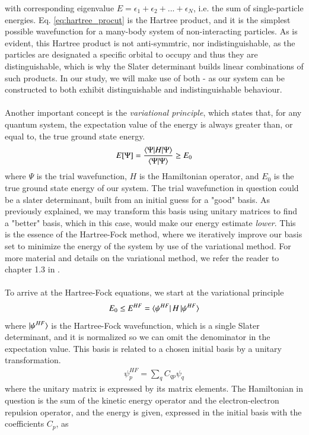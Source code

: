 \documentclass{subfiles}
\begin{document}
with corresponding eigenvalue $E = \epsilon_1 + \epsilon_2 + ... + \epsilon_N$, i.e. the sum of single-particle energies. Eq. \ref{eq:hartree_procut} is the Hartree product, and it is the simplest possible wavefunction for a many-body system of non-interacting particles. As is evident, this Hartree product is not anti-symmtric, nor indistinguishable, as the particles are designated a specific orbital to occupy and thus they are distinguishable, which is why the Slater determinant builds linear combinations of such products. In our study, we will make use of both - as our system can be constructed to both exhibit distinguishable and indistinguishable behaviour.\\ \\
Another important concept is the \emph{variational principle}, which states that, for any quantum system, the expectation value of the energy is always greater than, or equal to, the true ground state energy. 
\begin{align}
    E[\Psi] = \frac{\braket{\Psi|H|\Psi}}{\braket{\Psi|\Psi}} \geq E_0 \label{eq:variational_principle}
\end{align}
where $\Psi$ is the trial wavefunction, $H$ is the Hamiltonian operator, and $E_0$ is the true ground state energy of our system. The trial wavefunction in question could be a slater determinant, built from an initial guess for a "good" basis. As previously explained, we may transform this basis using unitary matrices to find a "better" basis, which in this case, would make our energy estimate \emph{lower}. This is the essence of the Hartree-Fock method, where we iteratively improve our basis set to minimize the energy of the system by use of the variational method. For more material and details on the variational method, we refer the reader to chapter 1.3 in \cite{szabo1996modern}.
\\\\
To arrive at the Hartree-Fock equations, we start at the variational principle
\begin{align*}
    E_0 \leq E^{HF} = \bra{\psi^{HF}}H\ket{\psi^{HF}}
\end{align*}
where $\ket{\psi^{HF}}$ is the Hartree-Fock wavefunction, which is a single Slater determinant, and it is normalized so we can omit the denominator in the expectation value. This basis is related to a chosen initial basis by a unitary transformation.
\begin{align*}
    \psi^{HF}_p = \sum_qC_{qp}\psi_q
\end{align*}
where the unitary matrix is expressed by its matrix elements. The Hamiltonian in question is the sum of the kinetic energy operator and the electron-electron repulsion operator, and the energy is given, expressed in the initial basis with the coefficients $C_p$, as
\end{document}
